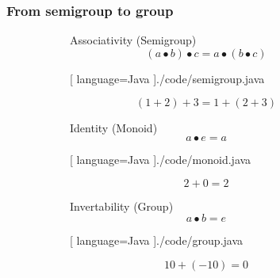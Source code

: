 \begin{frame}
  \frametitle{From semigroup to group}
  \begin{figure}[H]
    \begin{subfigure}[h]{0.45\textwidth}
      Associativity (Semigroup)
      \begin{equation}
        (a \bullet b) \bullet c = a \bullet (b \bullet c)
      \end{equation}
    \end{subfigure}
    \hfill
    \begin{subfigure}[h]{0.45\textwidth}
      \pause
  \begin{center}
    
    [ language=Java
    ]{./code/semigroup.java}
  \end{center}
\end{subfigure}
  \end{figure}
      \pause
      \begin{equation}
        (1 + 2) + 3 = 1 + (2 + 3)
      \end{equation}
      \pause
  \begin{figure}[H]
    \begin{subfigure}[h]{0.45\textwidth}
      Identity (Monoid)
      \begin{equation}
        a \bullet e = a
      \end{equation}
    \end{subfigure}
    \hfill
    \begin{subfigure}[h]{0.45\textwidth}
      \pause
  \begin{center}
    
    [ language=Java
    ]{./code/monoid.java}
  \end{center}
\end{subfigure}
  \end{figure}
      \pause
      \begin{equation}
        2 + 0 = 2
      \end{equation}
      \pause
  \begin{figure}[H]
    \begin{subfigure}[h]{0.45\textwidth}
      Invertability (Group)
      \begin{equation}
        a \bullet b = e
      \end{equation}
    \end{subfigure}
    \hfill
    \begin{subfigure}[h]{0.45\textwidth}
      \pause
  \begin{center}
    
    [ language=Java
    ]{./code/group.java}
  \end{center}
\end{subfigure}
  \end{figure}
      \pause
      \begin{equation}
        10 + (-10) = 0
      \end{equation}
\end{frame}

